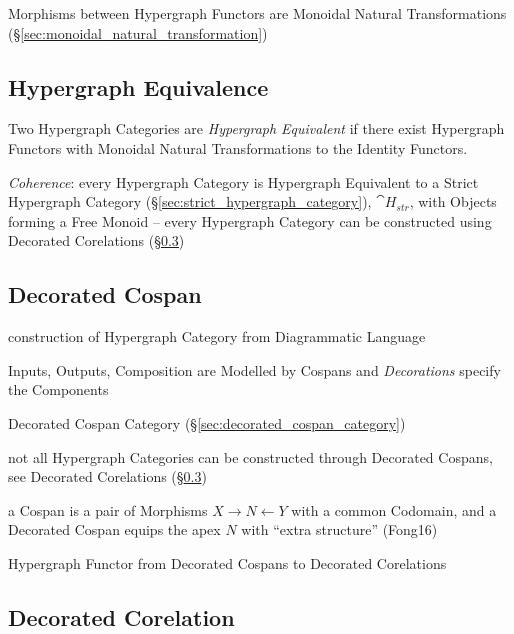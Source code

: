 Morphisms between Hypergraph Functors are Monoidal Natural
Transformations (\S\ref{sec:monoidal_natural_transformation})



\subsection{Hypergraph Equivalence}\label{sec:hypergraph_equivalence}

Two Hypergraph Categories are \emph{Hypergraph Equivalent} if there
exist Hypergraph Functors with Monoidal Natural Transformations to the
Identity Functors.

\emph{Coherence}: every Hypergraph Category is Hypergraph Equivalent
to a Strict Hypergraph Category
(\S\ref{sec:strict_hypergraph_category}), $\cat{H}_{str}$, with
Objects forming a Free Monoid -- every Hypergraph Category can be
constructed using Decorated Corelations
(\S\ref{sec:decorated_corelation})



\subsection{Decorated Cospan}\label{sec:decorated_cospan}

construction of Hypergraph Category from Diagrammatic Language

Inputs, Outputs, Composition are Modelled by Cospans and
\emph{Decorations} specify the Components

Decorated Cospan Category (\S\ref{sec:decorated_cospan_category})

not all Hypergraph Categories can be constructed through Decorated
Cospans, see Decorated Corelations (\S\ref{sec:decorated_corelation})

a Cospan is a pair of Morphisms $X \rightarrow N \leftarrow Y$ with a
common Codomain, and a Decorated Cospan equips the apex $N$ with
``extra structure'' (Fong16) %

Hypergraph Functor from Decorated Cospans to Decorated Corelations



\subsection{Decorated Corelation}\label{sec:decorated_corelation}

